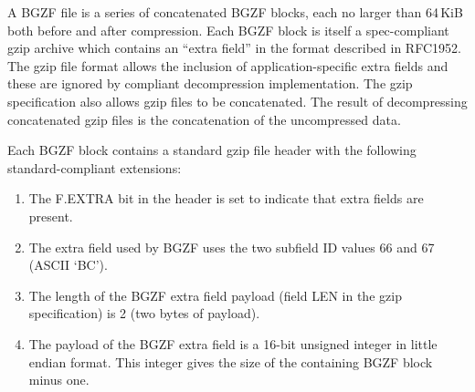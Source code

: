 \documentclass[10pt]{article}
\begin{document}
A BGZF file is a series of concatenated BGZF blocks, each no larger
than 64\,KiB both before and after compression. Each BGZF block
is itself a spec-compliant gzip archive which contains an ``extra field''
in the format described in RFC1952. The gzip file format allows the
inclusion of application-specific extra fields and these are ignored by
compliant decompression implementation. The gzip specification also
allows gzip files to be concatenated. The result of decompressing
concatenated gzip files is the concatenation of the uncompressed data.

Each BGZF block contains a standard gzip file header with the following
standard-compliant extensions:

\begin{enumerate}
\item The {\sf F.EXTRA} bit in the header is set to indicate that extra
  fields are present.
\item The extra field used by BGZF uses the two subfield ID values 66 and 67 (ASCII `BC').
\item The length of the BGZF extra field payload (field {\sf LEN} in the
  gzip specification) is 2 (two bytes of payload).
\item The payload of the BGZF extra field is a 16-bit unsigned integer
  in little endian format. This integer gives the size of the containing
  BGZF block minus one.
\end{enumerate}
\end{document}

